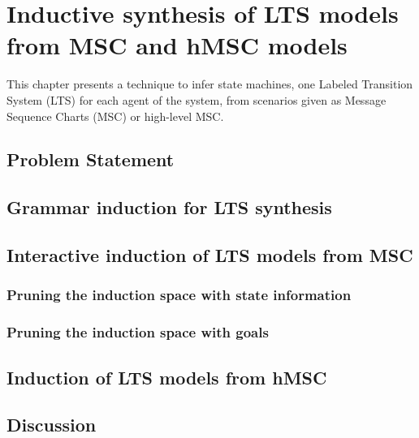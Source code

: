 \chapter{Inductive synthesis of LTS models from MSC and hMSC models\label{chapter:inductive-synthesis}}

This chapter presents a technique to infer state machines, one Labeled Transition System (LTS) for each agent of the system, from scenarios given as Message Sequence Charts (MSC) or high-level MSC.


\section{Problem Statement}



\section{Grammar induction for LTS synthesis\label{section:inductive-background}}




\section{Interactive induction of LTS models from MSC}

\subsection{Pruning the induction space with state information}

\subsection{Pruning the induction space with goals}


\section{Induction of LTS models from hMSC\label{section:inductive-from-hMSC}}

\section{Discussion\label{section:inductive-discussion}}
